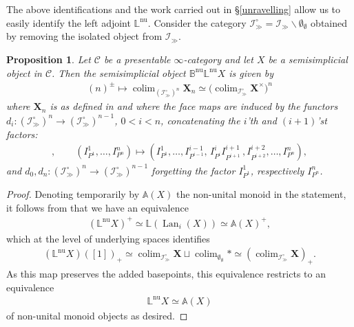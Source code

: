 \documentclass[12pt, reqno]{amsart}
\theoremstyle{plain}
\newtheorem{proposition}[theorem]{Proposition}
\theoremstyle{definition}
\begin{document}
The above identifications and the work carried out in \S \ref{unravelling} allow us to easily identify the left adjoint $\mathbb{L}^{\operatorname{nu}}$. Consider the category $\mathcal{I}_\gg^\circ=\mathcal{I}_\gg\smallsetminus \emptyset_\emptyset$ obtained by removing the isolated object from $\mathcal{I}_\gg$.

\begin{proposition}\label{non-unital monoid over Igg}
Let $\mathcal{C}$ be a presentable $\infty$-category and let $X$ be a semisimplicial object in $\mathcal{C}$. Then the semisimplicial object $\mathbb{B}^{\operatorname{nu}}\mathbb{L}^{\operatorname{nu}}X$ is given by
\begin{align*}
(n)^\pm \mapsto \mathop{\operatorname{colim}}_{(\mathcal{I}^\circ_\gg)^n}\mathbf{X}_n\simeq \big(\mathop{\operatorname{colim}}_{\mathcal{I}^\circ_\gg}\mathbf{X}^{\times}\big)^n
\end{align*}
where $\mathbf{X}_n$ is as defined in  and where the face maps are induced by the functors $d_i\colon (\mathcal{I}^\circ_\gg)^n\rightarrow (\mathcal{I}^\circ_\gg)^{n-1}$, $0<i<n$, concatenating the $i$'th and $(i+1)$'st factors:
\begin{align*}
,\qquad (I^1_{P^1},\ldots,I^n_{P^n})\mapsto (I^1_{P^1},\ldots,I^{i-1}_{P^{i-1}},\, I^i_{P^i}I^{i+1}_{P^{i+1}}\, , I^{i+2}_{P^{i+2}},\ldots,I^n_{P^n}),
\end{align*}
and $d_0,d_n\colon (\mathcal{I}_\gg^\circ)^n\rightarrow (\mathcal{I}_\gg^\circ)^{n-1}$ forgetting the factor $I^1_{P^1}$, respectively $I^n_{P^n}$.
\end{proposition}
\begin{proof}
Denoting temporarily by $\mathbb{A}(X)$ the non-unital monoid in the statement, it follows from  that we have an equivalence
\begin{align*}
(\mathbb{L}^{\operatorname{nu}}X)^+ \simeq \mathbb{L}(\operatorname{Lan}_i(X))\simeq \mathbb{A}(X)^+,
\end{align*}
which at the level of underlying spaces identifies
\begin{align*}
(\mathbb{L}^{\operatorname{nu}}X)([1])_+\simeq \mathop{\operatorname{colim}}_{\mathcal{I}_\gg^\circ} \mathbf{X} \sqcup \mathop{\operatorname{colim}}_{\emptyset_\emptyset}\ast \simeq (\mathop{\operatorname{colim}}_{\mathcal{I}_\gg^\circ} \mathbf{X})_+.
\end{align*}
As this map preserves the added basepoints, this equivalence restricts to an equivalence
\begin{align*}
\mathbb{L}^{\operatorname{nu}}X\simeq \mathbb{A}(X)
\end{align*}
of non-unital monoid objects as desired.
\end{proof}
\end{document}
